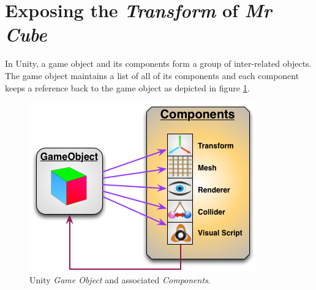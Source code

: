 \section{Exposing the \emph{Transform} of \emph{Mr Cube}}
\label{exposingthetransformofmrcube}

In Unity, a game object and its components form a group of inter-related objects. The game object maintains a list of all of its components and each component keeps a reference back to the game object as depicted in figure \ref{game-object-composition.png}.

\begin{figure}[htbp]
\centering
\includegraphics[keepaspectratio,width=\textwidth,height=0.75\textheight]{game-object-composition.png}
\caption{Unity \emph{Game Object} and associated \emph{Components}.}
\label{game-object-composition.png}
\end{figure}

